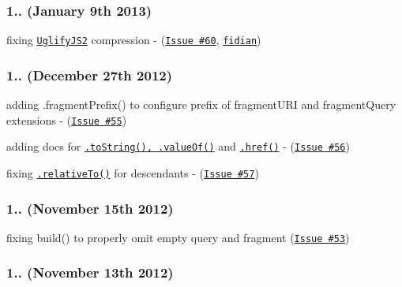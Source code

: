 \subsubsection*{1.. (January 9th 2013)}


\begin{DoxyItemize}
\item fixing \href{https://github.com/mishoo/UglifyJS2}{\tt Uglify\+J\+S2} compression -\/ (\href{https://github.com/medialize/URI.js/issues/60}{\tt Issue \#60}, \href{https://github.com/fidian}{\tt fidian})
\end{DoxyItemize}

\subsubsection*{1.. (December 27th 2012)}


\begin{DoxyItemize}
\item adding {\ttfamily .fragment\+Prefix()} to configure prefix of fragment\+U\+RI and fragment\+Query extensions -\/ (\href{https://github.com/medialize/URI.js/issues/55}{\tt Issue \#55})
\item adding docs for \href{http://medialize.github.io/URI.js/docs.html#toString}{\tt {\ttfamily .to\+String()}, {\ttfamily .value\+Of()}} and \href{http://medialize.github.io/URI.js/docs.html#href}{\tt {\ttfamily .href()}} -\/ (\href{https://github.com/medialize/URI.js/issues/56}{\tt Issue \#56})
\item fixing \href{http://medialize.github.io/URI.js/docs.html#relativeto}{\tt {\ttfamily .relative\+To()}} for descendants -\/ (\href{https://github.com/medialize/URI.js/issues/57}{\tt Issue \#57})
\end{DoxyItemize}

\subsubsection*{1.. (November 15th 2012)}


\begin{DoxyItemize}
\item fixing build() to properly omit empty query and fragment (\href{https://github.com/medialize/URI.js/issues/53}{\tt Issue \#53})
\end{DoxyItemize}

\subsubsection*{1.. (November 13th 2012)}


